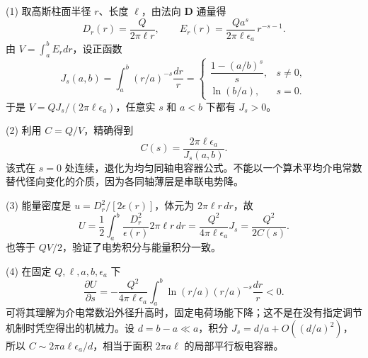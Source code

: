 (1) 取高斯柱面半径 \(r\)、长度 \(\ell\)，由法向 \(\boldsymbol D\) 通量得
\[
D_r(r)=\frac Q{2\pi \ell r},\qquad
E_r(r)=\frac{Qa^s}{2\pi\ell\epsilon_a}\,r^{-s-1}.
\]
由 \(V=\int_a^b E_r dr\)，设正函数
\[
J_s(a,b)=\int_a^b(r/a)^{-s}\frac{dr}{r}
=\begin{cases}\dfrac{1-(a/b)^s}{s},&s\ne0,\\[3pt]\ln(b/a),&s=0.\end{cases}
\]
于是 \(V=QJ_s/(2\pi\ell\epsilon_a)\)，任意实 \(s\) 和 \(a<b\) 下都有 \(J_s>0\)。

(2) 利用 \(C=Q/V\)，精确得到
\[
C(s)=\frac{2\pi\ell\epsilon_a}{J_s(a,b)}.
\]
该式在 \(s=0\) 处连续，退化为均匀同轴电容器公式。不能以一个算术平均介电常数替代径向变化的介质，因为各同轴薄层是串联电势降。

(3) 能量密度是 \(u=D_r^2/[2\epsilon(r)]\)，体元为 \(2\pi\ell r\,dr\)，故
\[
U=\frac12\int_a^b\frac{D_r^2}{\epsilon(r)}2\pi\ell r\,dr
=\frac{Q^2}{4\pi\ell\epsilon_a}J_s
=\frac{Q^2}{2C(s)}.
\]
也等于 \(QV/2\)，验证了电势积分与能量积分一致。

(4) 在固定 \(Q,\ell,a,b,\epsilon_a\) 下
\[
\frac{\partial U}{\partial s}=-\frac{Q^2}{4\pi\ell\epsilon_a}\int_a^b
\ln(r/a)(r/a)^{-s}\frac{dr}{r}<0.
\]
可将其理解为介电常数沿外径升高时，固定电荷场能下降；这不是在没有指定调节机制时凭空得出的机械力。设 \(d=b-a\ll a\)，积分 \(J_s=d/a+O((d/a)^2)\)，所以 \(C\sim2\pi a\ell\epsilon_a/d\)，相当于面积 \(2\pi a\ell\) 的局部平行板电容器。
